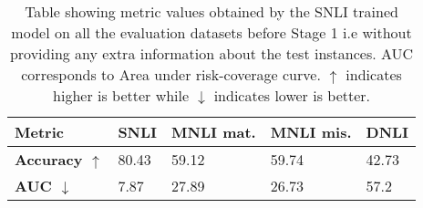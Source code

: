 \begin{table}[t]
    \centering
    \small 
    \begin{tabular}{p{1.7cm}p{0.9cm}p{0.9cm}p{0.9cm}p{0.9cm}}
    \toprule
        \textbf{Metric} & \textbf{SNLI}  & \textbf{MNLI mat.} &  \textbf{MNLI mis.}  & \textbf{DNLI}\\
        \midrule
        \textbf{Accuracy $\uparrow$} & 80.43 & 59.12 & 59.74 & 42.73\\
        \textbf{AUC $\downarrow$}  & 7.87 & 27.89 & 26.73 & 57.2\\
        
    \bottomrule
    \end{tabular}
    \caption{Table showing metric values obtained by the SNLI trained model on all the evaluation datasets before Stage 1 i.e without providing any extra information about the test instances. AUC corresponds to Area under risk-coverage curve. $\uparrow$ indicates higher is better while $\downarrow$ indicates lower is better.}
    \label{tab:stage0_results}
\end{table}
